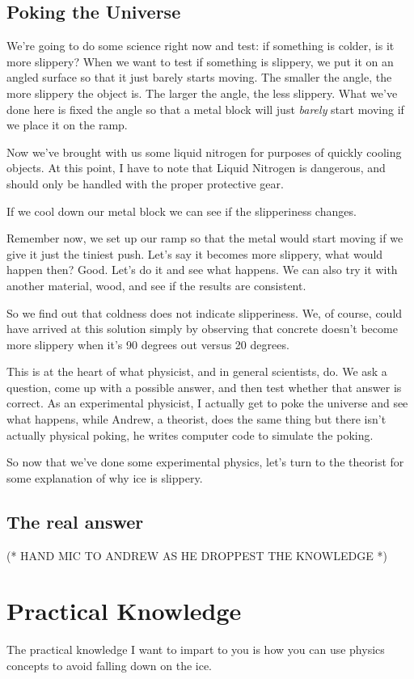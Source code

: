\documentclass[12pt]{article}
\begin{document}
\subsection{Poking the Universe}
We're going to do some science right now 
and test: if something is colder, is it more slippery? When we want to test 
if something is slippery, we put it on an angled surface so that it just barely 
starts moving. The smaller the angle, the more slippery the object is. The 
larger the angle, the less slippery. 
What we've done here is fixed the angle so that a metal block will just \emph{barely}
start moving if we place it on the ramp. 

Now we've brought with us some 
liquid nitrogen for purposes of quickly cooling objects. 
At this point, I have to note that Liquid Nitrogen is 
dangerous, and should only be handled with the proper protective gear. 

If we cool down our metal block
we can see if the slipperiness changes. 

Remember now, we set up our ramp so that the metal would start moving if
we give it just the tiniest push. Let's say it becomes more slippery, what 
would happen then? Good. Let's do it and see what happens. 
We can also try it with another material, wood, and see if the results are 
consistent.

So we find out that coldness does not indicate slipperiness.
We, of course, could have arrived at this solution simply by observing that
concrete doesn't become more slippery when it's 90 degrees out versus 20 degrees. 

This is at the heart of what physicist, and in general scientists, do. We ask 
a question, come up with a possible answer, and then test whether that answer is
correct. As an experimental physicist, I actually get to poke the universe and
see what happens, while Andrew, a theorist, does the same thing but there isn't actually 
physical poking, he writes computer code to simulate the poking. 

So now that
we've done some experimental physics, let's turn to the theorist for some
explanation of why ice is slippery. 

\subsection{The real answer}

(* HAND MIC TO ANDREW AS HE DROPPEST THE KNOWLEDGE *)


\section{Practical Knowledge}
The practical knowledge I want to impart to you is how you can
use physics concepts to avoid falling down on the 
ice.
\end{document}
